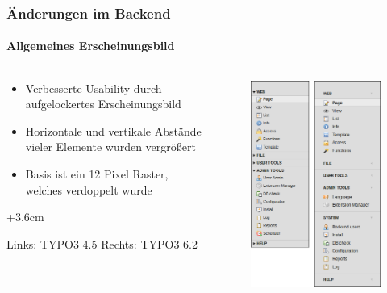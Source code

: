 
\begin{frame}[fragile]
	\frametitle{Änderungen im Backend}
	\framesubtitle{Allgemeines Erscheinungsbild}

	\begin{columns}[T]

		\begin{column}{.5\textwidth}
			\begin{itemize}
				\item Verbesserte Usability durch aufgelockertes Erscheinungsbild
				\item Horizontale und vertikale Abstände vieler Elemente wurden vergrößert
				\item Basis ist ein 12 Pixel Raster, welches verdoppelt wurde
			\end{itemize}

			\advance\leftskip+3.6cm

			\smaller
				Links: TYPO3 4.5\newline
				Rechts: TYPO3 6.2
			\normalsize
		\end{column}

		\begin{column}{.5\textwidth}
			\begin{figure}\vspace*{-0.4cm}
				\includegraphics[width=0.6\linewidth]{Images/BackendChanges/VisualAppearance.png}
			\end{figure}
		\end{column}

	\end{columns}

\end{frame}

